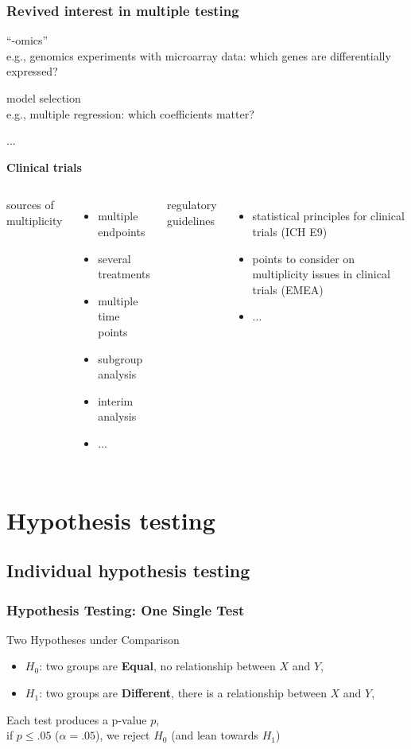 \documentclass[xcolor={dvipsnames}]{beamer}
\newcommand{\rbf}[1]{\textcolor{redUnipd}{ #1}}
\begin{document}
\begin{frame}
\frametitle{Revived interest in multiple testing}

\large{``-omics''}   \\
\scriptsize{e.g., genomics experiments with microarray data: which genes are differentially expressed?}

\large{model selection}\\
\scriptsize{e.g., multiple regression: which coefficients matter?}

\large{...}


\textbf{\rbf{Clinical trials}}
\begin{columns}[t]
\textcolor{cambridgedarkorange}{sources of multiplicity}
\begin{itemize}
\item multiple endpoints
\item several treatments
\item multiple time points
\item subgroup analysis
\item interim analysis
\item $\ldots$
\end{itemize}

\textcolor{cambridgedarkorange}{regulatory guidelines}
\begin{itemize}
\item statistical principles for clinical trials (ICH E9)
\item points
to consider on multiplicity issues in clinical
trials (EMEA)
\item $\ldots$
\end{itemize}
\end{columns}




\end{frame}

\section{Hypothesis testing}

\subsection{Individual hypothesis testing}
\begin{frame}
\frametitle{Hypothesis Testing: One Single Test}

\rbf{Two Hypotheses under Comparison}

\begin{itemize}
\item $H_0$: two groups are \textbf{Equal}, no relationship between $X$ and $Y$, 
\item $H_1$: two groups are \textbf{Different}, there is a relationship between $X$ and $Y$,
\end{itemize}

\bigskip

Each test produces a p-value $p$, \\  if $p\leq .05$ ($\alpha=.05$), we reject $H_0$ (and lean towards $H_1$)
\end{frame}
\end{document}
